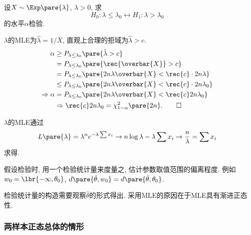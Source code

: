 \documentclass[../Statistics.tex]{subfiles}
\begin{document}
\begin{sample}
    \begin{ex}
        设$X\sim \Exp\pare{\lambda}$, $\lambda > 0$, 求
        \[ H_0: \lambda \le \lambda_0 \leftrightarrow H_1: \lambda > \lambda_0 \]
        的水平$\alpha$检验.
    \end{ex}
    \begin{solution}
        $\lambda$的MLE为$\hat\lambda = 1/\overbar{X}$, 直观上合理的拒域为$\hat\lambda > c$.
        \begin{align*}
            \alpha &\ge P_{\lambda \le \lambda_0}\pare{\hat\lambda > c} \\
            &= P_{\lambda \le \lambda_0} \pare{\rec{\overbar{X}} > c} \\
            &= P_{\lambda \le \lambda_0} \pare{2n\lambda \overbar{X} < \rec{c}\cdot 2n\lambda} \\
            &\le P_{\lambda \le \lambda_0}\pare{2n\lambda \overbar{X} < \rec{c}\cdot 2n\lambda_0} \\
            \Rightarrow \alpha &= P_{\lambda\le \lambda_0} \pare{2n\lambda \overbar{X} < \rec{c}2n\lambda_0} \\
            &\Rightarrow \rec{c} 2n\lambda_0 = \chi_{1-\alpha}^2\pare{2n}. \qedhere
        \end{align*}
    \end{solution}
    \begin{remark}
        $\lambda$的MLE通过
        \[ L\pare{\lambda} = \lambda^n e^{-\lambda \sum x_i} \rightarrow n\log\lambda -\lambda \sum x_i \rightarrow \frac{n}{\lambda} = \sum x_i \]
        求得.
    \end{remark}
\end{sample}
假设检验时, 用一个检验统计量来度量之, 估计参数取值范围的偏离程度. 例如$w_0 = \lbr{-\infty,\theta_0}$, $d\pare{\hat\theta,w_0} = d\pare{\hat\theta,\theta_0}$.
\par
检验统计量的构造需要观察$\hat\theta$的形式得出. 采用MLE的原因在于MLE具有渐进正态性.


\subsubsection{两样本正态总体的情形} %
\label{ssub:两样本正态总体的情形}
\end{document}
